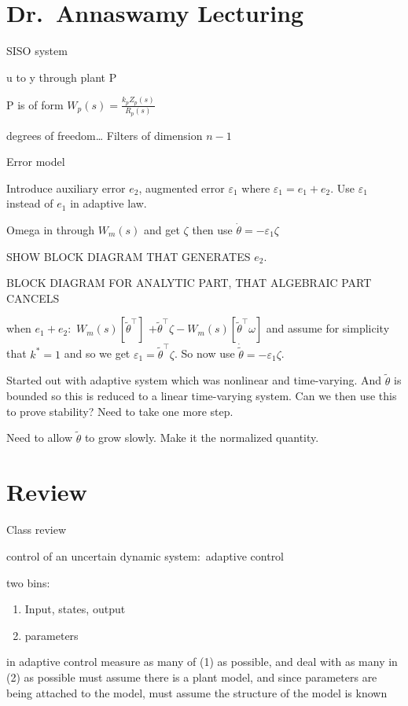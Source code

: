 \section{Dr.\ Annaswamy Lecturing}

SISO system

u to y through plant P

P is of form $W_{p}(s)=\frac{k_{p}Z_{p}(s)}{R_{p}(s)}$

degrees of freedom\ldots
Filters of dimension $n-1$

Error model

Introduce auxiliary error $e_{2}$, augmented error $\varepsilon_{1}$ where $\varepsilon_{1}=e_{1}+e_{2}$.
Use $\varepsilon_{1}$ instead of $e_{1}$ in adaptive law.

Omega in through $W_{m}(s)$ and get $\zeta$ then use $\dot{\theta}=-\varepsilon_{1}\zeta$

SHOW BLOCK DIAGRAM THAT GENERATES $e_{2}$.

BLOCK DIAGRAM FOR ANALYTIC PART, THAT ALGEBRAIC PART CANCELS

when $e_{1}+e_{2}$:\ $W_{m}(s)[\tilde{\theta}^{\top}]$ $+\tilde{\theta}^{\top}\zeta-W_{m}(s)[\tilde{\theta}^{\top}\omega]$ and assume for simplicity that $k^{*}=1$ and so we get $\varepsilon_{1}=\tilde{\theta}^{\top}\zeta$.
So now use $\dot{\tilde{\theta}}=-\varepsilon_{1}\zeta$.

Started out with adaptive system which was nonlinear and time-varying.
And $\tilde{\theta}$ is bounded so this is reduced to a linear time-varying system.
Can we then use this to prove stability? Need to take one more step.

Need to allow $\tilde{\theta}$ to grow slowly.
Make it the normalized quantity.

\section{Review}

Class review

control of an uncertain dynamic system:\ adaptive control

two bins:
\begin{enumerate}
  \setlength{\itemsep}{0pt}
  \item{Input, states, output}
  \item{parameters}
\end{enumerate}

in adaptive control measure as many of (1) as possible, and deal with as many in (2) as possible
must assume there is a plant model, and since parameters are being attached to the model, must assume the structure of the model is known

